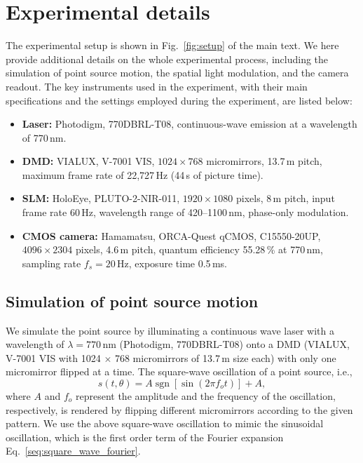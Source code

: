 \documentclass[aps,pra,10pt,showpacs,amsmath,amssymb,floatfix,superscriptaddress,twocolumn]{revtex4-2}
\begin{document}
\section{Experimental details}

The experimental setup is shown in Fig.~\ref{fig:setup} of the main text.
We here provide additional details on the whole experimental process, including the simulation of point source motion, the spatial light modulation, and the camera readout.
The key instruments used in the experiment, with their main specifications and the settings employed during the experiment, are listed below:
\begin{itemize}
    \item \textbf{Laser:} Photodigm, 770DBRL-T08, continuous-wave emission at a wavelength of 770\,nm.
    \item \textbf{DMD:} VIALUX, V-7001 VIS, $1024\times768$ micromirrors, 13.7\,{\textmu}m pitch, maximum frame rate of 22,727\,Hz (44\,{\textmu}s of picture time).
    \item \textbf{SLM:} HoloEye, PLUTO-2-NIR-011, $1920\times1080$ pixels, 8\,{\textmu}m pitch, input frame rate 60\,Hz, wavelength range of 420--1100\,nm, phase-only modulation.
    \item \textbf{CMOS camera:} Hamamatsu, ORCA-Quest qCMOS, C15550-20UP, $4096\times2304$ pixels, 4.6\,{\textmu}m pitch, quantum efficiency 55.28\,\% at 770\,nm, sampling rate $f_s = 20$\,Hz, exposure time 0.5\,ms.
\end{itemize}

\subsection{Simulation of point source motion }

We simulate the point source by illuminating a continuous wave laser with a wavelength of \(\lambda = 770\,\mathrm{nm}\) (Photodigm, 770DBRL-T08) onto a DMD (VIALUX, V-7001 VIS with 1024 $\times$ 768 micromirrors of 13.7\,{\textmu}m size each) with only one micromirror flipped at a time.
The square-wave oscillation of a point source, i.e.,
\begin{equation}
    s(t, \theta) = A \operatorname{sgn}[\sin(2\pi f_o t)] + A,
\end{equation}
where $A$ and $f_{o}$ represent the amplitude and the frequency of the oscillation, respectively, is rendered by flipping different micromirrors according to the given pattern.
We use the above square-wave oscillation to mimic the sinusoidal oscillation, which is the first order term of the Fourier expansion Eq.~\eqref{seq:square_wave_fourier}.
\end{document}
